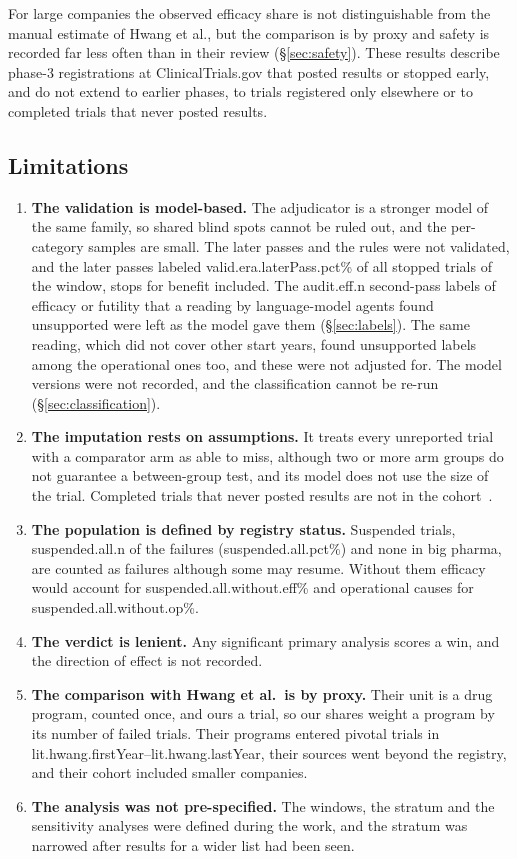 \documentclass[preprint,11pt]{elsarticle}
\begin{document}
For large companies the observed efficacy share is not distinguishable from the manual estimate of Hwang et al., but the comparison is by proxy and safety is recorded far less often than in their review (\S\ref{sec:safety}). These results describe phase-3 registrations at ClinicalTrials.gov that posted results or stopped early, and do not extend to earlier phases, to trials registered only elsewhere or to completed trials that never posted results.

\subsection{Limitations}\label{sec:limitations}
\begin{enumerate}
\item\label{lim:validation} \textbf{The validation is model-based.} The adjudicator is a stronger model of the same family, so shared blind spots cannot be ruled out, and the per-category samples are small. The later passes and the rules were not validated, and the later passes labeled \num{valid.era.laterPass.pct}\% of all stopped trials of the window, stops for benefit included. The \num{audit.eff.n} second-pass labels of efficacy or futility that a reading by language-model agents found unsupported were left as the model gave them (\S\ref{sec:labels}). The same reading, which did not cover other start years, found unsupported labels among the operational ones too, and these were not adjusted for. The model versions were not recorded, and the classification cannot be re-run (\S\ref{sec:classification}).
\item\label{lim:imputation} \textbf{The imputation rests on assumptions.} It treats every unreported trial with a comparator arm as able to miss, although two or more arm groups do not guarantee a between-group test, and its model does not use the size of the trial. Completed trials that never posted results are not in the cohort~\cite{anderson2015,devito2020}.
\item\label{lim:population} \textbf{The population is defined by registry status.} Suspended trials, \num{suspended.all.n} of the failures (\num{suspended.all.pct}\%) and none in big pharma, are counted as failures although some may resume. Without them efficacy would account for \num{suspended.all.without.eff}\% and operational causes for \num{suspended.all.without.op}\%.
\item\label{lim:winrule} \textbf{The verdict is lenient.} Any significant primary analysis scores a win, and the direction of effect is not recorded.
\item\label{lim:hwang} \textbf{The comparison with Hwang et al.\ is by proxy.} Their unit is a drug program, counted once, and ours a trial, so our shares weight a program by its number of failed trials. Their programs entered pivotal trials in \num{lit.hwang.firstYear}--\num{lit.hwang.lastYear}, their sources went beyond the registry, and their cohort included smaller companies.
\item\label{lim:plan} \textbf{The analysis was not pre-specified.} The windows, the stratum and the sensitivity analyses were defined during the work, and the stratum was narrowed after results for a wider list had been seen.
\end{enumerate}
\end{document}
